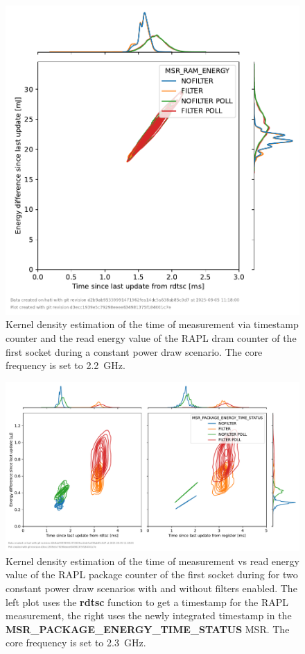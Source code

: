 \begin{figure}[]
    \centering
    \includegraphics[width=0.54\columnwidth]{fig/rapl-update-intervals/MSR_RAM_ENERGY_2200000.pdf}
    \caption{Kernel density estimation of the time of measurement via timestamp counter and the read energy value of the RAPL dram counter of the first socket during a constant power draw scenario.
    The core frequency is set to \SI{2.2}{\GHz}.}
\end{figure}

\clearpage
\begin{figure}[]
    \centering
    \includegraphics[width=\columnwidth]{fig/rapl-update-intervals/MSR_PACKAGE_ENERGY_TIME_STATUS_2300000.pdf}
    \caption{Kernel density estimation of the time of measurement vs read energy value of the RAPL package counter of the first socket during for two constant power draw scenarios with and without filters enabled.
    The left plot uses the \textbf{rdtsc} function to get a timestamp for the RAPL measurement, the right uses the newly integrated timestamp in the \textbf{MSR\_PACKAGE\_ENERGY\_TIME\_STATUS} MSR.
    The core frequency is set to \SI{2.3}{\GHz}.}
\end{figure}

